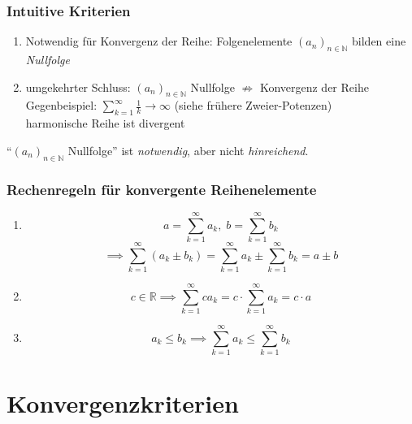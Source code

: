 \subsubsection*{Intuitive Kriterien}

\begin{enumerate}
    \item Notwendig für Konvergenz der Reihe: Folgenelemente $(a_n)_{n \in \mathbb{N}}$ bilden eine \emph{Nullfolge}
    \item umgekehrter Schluss: $(a_n)_{n \in \mathbb{N}}$ Nullfolge $\not\Rightarrow$ Konvergenz der Reihe\\
        Gegenbeispiel: $\sum_{k=1}^{\infty} \frac{1}{k} \rightarrow \infty $ (siehe frühere Zweier-Potenzen) \\
        harmonische Reihe ist divergent
\end{enumerate}

\begin{note}
    "`$(a_n)_{n \in \mathbb{N}}$ Nullfolge"' ist \emph{notwendig}, aber nicht \emph{hinreichend}.
\end{note}

\subsubsection*{Rechenregeln für konvergente Reihenelemente}
\begin{enumerate}
    \item \begin{equation*} a = \sum_{k=1}^{\infty} a_k,\; b = \sum_{k=1}^{\infty} b_k \end{equation*}
        \begin{equation*}\implies \sum_{k = 1}^{\infty} \left( a_k \pm b_k \right) = \sum_{k=1}^{\infty} a_k \pm \sum_{k=1}^{\infty} b_k = a \pm b
        \end{equation*}
    \item \begin{equation*}c \in \mathbb{R} \implies \sum_{k=1}^{\infty} c a_k = c \cdot\sum_{k=1}^{\infty} a_k = c \cdot a \end{equation*}
    \item \begin{equation*}a_k \leq b_k \implies \sum_{k=1}^{\infty} a_k \leq \sum_{k=1}^{\infty} b_k \end{equation*}
\end{enumerate}

\section{Konvergenzkriterien}

